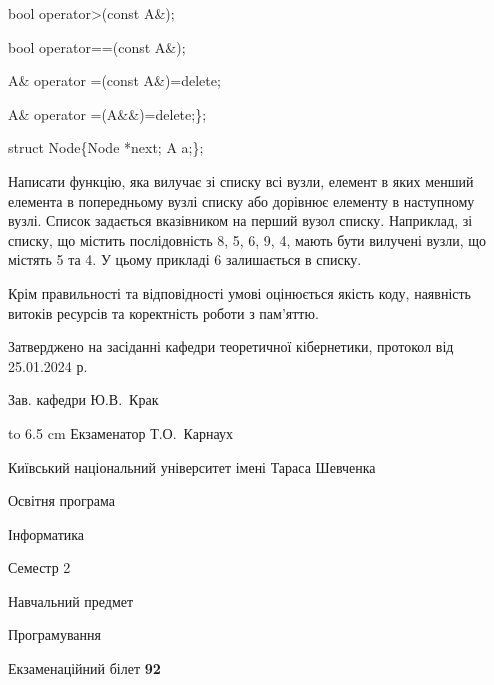\documentclass[12pt, ukrainian]{article}
\begin{document}
{\quad  bool operator>(const A\&); 

\quad  bool operator==(const A\&); 

\quad A\& operator =(const A\&)=delete; 

\quad  A\& operator =(A\&\&)=delete;\};

struct Node\{Node *next; A a;\};

 Написати функцію, яка вилучає зі списку всі вузли, елемент в яких менший елемента в попередньому вузлі списку або дорівнює елементу в наступному вузлі. Список задається вказівником на перший вузол списку. Наприклад, зі списку, що містить послідовність 8, 5, 6, 9, 4, мають бути вилучені вузли, що містять 5 та 4. У цьому прикладі 6 залишається в списку.

Крім правильності та відповідності умові оцінюється якість коду, наявність витоків ресурсів та коректність роботи з пам'яттю. 

}
{\smallskip\smallskip \begin {scriptsize} Затверджено на засіданні кафедри теоретичної кібернетики, протокол   від   25.01.2024 р.\par\smallskip\smallskip\smallskip\smallskip
{\parbox {6.5 cm} {Зав. кафедри \dotfill Ю.В.~Крак}}\hspace {0.7cm} {\hbox to 6.5 cm { Екзаменатор \dotfill Т.О.~Карнаух}} \end{scriptsize}}
\newpage
{{\begin {scriptsize}\par
{ \center  Київський національний університет імені Тараса Шевченка \par}
{\parbox {5 cm}{Освітня програма \hfill}{\parbox {7 cm}{Інформатика\hfill}}\parbox {6 cm}{\hfill Семестр 2}}\par
{\parbox {5 cm} {Навчальний предмет \hfill}\parbox {7 cm}{Програмування \hfill}\parbox {6cm}{\hfill}\par}\vspace{-15pt} \end{scriptsize}}{\center Екзаменаційний білет \No \textbf { 92 }\par}}
\end{document}

